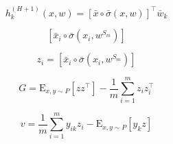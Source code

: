 \documentclass[letterpaper, 10pt]{article}
\newcommand{\Expected}{\mathrm{E}}
\begin{document}
\[ h_k^{(H+1)}(x,w) = [\bar{x} \circ \bar{\sigma}(x,w)]^\top \bar{w}_k \]

\[ [\bar{x}_i \circ \bar{\sigma}(x_i, w^{S_m})] \]



\[ z_i = [\bar{x}_i \circ \bar{\sigma}(x_i, w^{S_m})] \]

\[ G = \Expected_{x,y\sim P}[zz^\top] - \frac{1}{m}\sum_{i=1}^m z_i z_i^\top \]

\[ v = \frac{1}{m} \sum_{i=1}^m y_{ik} z_i - \Expected_{x,y \sim P}[y_k z] \]
\end{document}
